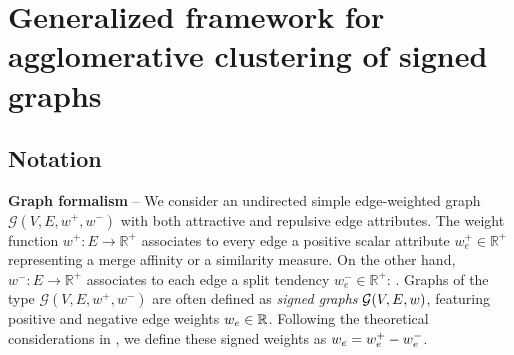 
\section{Generalized framework for agglomerative clustering of signed graphs} \label{sec:general_framework}

\subsection{Notation} \label{sec:notation}

\textbf{Graph formalism} -- We consider an undirected simple edge-weighted graph $\mathcal{G}(V,E,w^+, w^-)$ with both attractive and repulsive edge attributes.
The weight function $w^+: E \rightarrow \mathbb{R}^+$ associates to every edge a positive scalar attribute $w_e^+\in \mathbb{R}^+$ representing a merge affinity or a similarity measure.
On the other hand, $w^-: E \rightarrow \mathbb{R}^+$ associates to each edge a split tendency $w_e^- \in \mathbb{R}^+$: .
Graphs of the type $\mathcal{G}(V,E,w^+, w^-)$ are often defined as \emph{signed graphs} $\mathcal{G}(V,E,w)$, featuring positive and negative edge weights $w_e\in \mathbb{R}$. Following the theoretical considerations in \cite{lange2018partial}, we define these signed weights as ${w_e = w_e^+ - w_e^-}$. 

